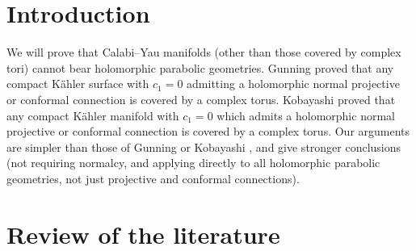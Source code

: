 \documentclass[pdftex]{sigma}
\begin{document}
\allowdisplaybreaks

\renewcommand{\PaperNumber}{090}

\FirstPageHeading










\section{Introduction}

We will prove that Calabi--Yau manifolds (other
than those covered by complex tori) cannot bear
holomorphic parabolic geometries.
Gunning \cite{Gunning:1978} proved that any compact K{\"a}hler surface
with $c_1=0$ admitting
a holomorphic normal projective or conformal connection
is covered by a complex torus. Kobayashi \cite{Kobayashi/Horst:1983}
proved that any compact K{\"a}hler manifold
with $c_1=0$ which admits a holomorphic normal projective or conformal connection
is covered by a complex torus. Our arguments are simpler than
those of Gunning \cite{Gunning:1978} or Kobayashi \cite{Kobayashi/Horst:1983},
and give stronger conclusions (not requiring
normalcy, and applying directly to all
holomorphic parabolic geometries, not just projective and
conformal connections).





\section{Review of the literature}
\end{document}
